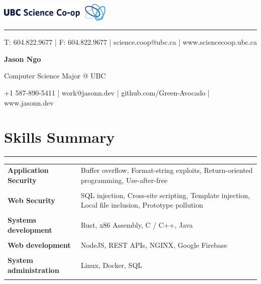 \documentclass[letterpaper]{article}
\newcommand{\sect}[1]{\section*{#1}
                        {\color{cyan}
                        \rule{\textwidth}{1pt}
                        \vspace{-1ex}}}
\begin{document}
    \begin{flushright}
        \includegraphics[width=0.4\textwidth]{ScienceCo-opLogo_UBC_H.eps}
    \end{flushright}

    \vspace{-2ex}
    \begin{minipage}{\dimexpr(\textwidth-56pt)}
        \begin{flushright}
        {\color{ubclightblue}\rule{\textwidth}{0.5pt}}

        {\small\color{ubcblue}
          T: 604.822.9677
        | F: 604.822.9677
        | science.coop@ubc.ca
        | www.sciencecoop.ubc.ca}
        \end{flushright}
    \end{minipage}

    {\Huge
    \textbf{Jason Ngo}}

    \vspace{1ex}
    {\large
    Computer Science Major @ UBC}

    {\small
      +1 587-890-5411
    | work@jasonn.dev
    | github.com/Green-Avocado
    | www.jasonn.dev
    }
    \vspace{1ex}

    \sect{Skills Summary}

        \begin{tabular}{p{}
                        p{}}
            \textbf{Application Security} &
                Buffer overflow,
                Format-string exploits,
                Return-oriented programming,
                Use-after-free
                \\
                \\
            \textbf{Web Security} &
                SQL injection,
                Cross-site scripting,
                Template injection,
                Local file inclusion,
                Prototype pollution
                \\
                \\
            \textbf{Systems development} &
                Rust,
                x86 Assembly,
                C / C++,
                Java
                \\
                \\
            \textbf{Web development} &
                NodeJS,
                REST APIs,
                NGINX,
                Google Firebase
                \\
                \\
            \textbf{System administration} &
                Linux,
                Docker,
                SQL
                \\
                \\
        \end{tabular}
\end{document}
